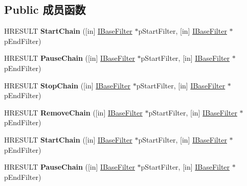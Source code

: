 \subsection*{Public 成员函数}
\begin{DoxyCompactItemize}
\item 
\mbox{\label{interface_i_filter_chain_a73c6357687d49a1899e3050467015457}} 
H\+R\+E\+S\+U\+LT {\bfseries Start\+Chain} (\mbox{[}in\mbox{]} \hyperlink{interface_i_base_filter}{I\+Base\+Filter} $\ast$p\+Start\+Filter, \mbox{[}in\mbox{]} \hyperlink{interface_i_base_filter}{I\+Base\+Filter} $\ast$p\+End\+Filter)
\item 
\mbox{\label{interface_i_filter_chain_a8cca21654dbb12c9628b6d4a640fdad8}} 
H\+R\+E\+S\+U\+LT {\bfseries Pause\+Chain} (\mbox{[}in\mbox{]} \hyperlink{interface_i_base_filter}{I\+Base\+Filter} $\ast$p\+Start\+Filter, \mbox{[}in\mbox{]} \hyperlink{interface_i_base_filter}{I\+Base\+Filter} $\ast$p\+End\+Filter)
\item 
\mbox{\label{interface_i_filter_chain_a8a05cfed16246fe01af19e4a2fe88d88}} 
H\+R\+E\+S\+U\+LT {\bfseries Stop\+Chain} (\mbox{[}in\mbox{]} \hyperlink{interface_i_base_filter}{I\+Base\+Filter} $\ast$p\+Start\+Filter, \mbox{[}in\mbox{]} \hyperlink{interface_i_base_filter}{I\+Base\+Filter} $\ast$p\+End\+Filter)
\item 
\mbox{\label{interface_i_filter_chain_a9441b421c84e989188e3fef73cf29553}} 
H\+R\+E\+S\+U\+LT {\bfseries Remove\+Chain} (\mbox{[}in\mbox{]} \hyperlink{interface_i_base_filter}{I\+Base\+Filter} $\ast$p\+Start\+Filter, \mbox{[}in\mbox{]} \hyperlink{interface_i_base_filter}{I\+Base\+Filter} $\ast$p\+End\+Filter)
\item 
\mbox{\label{interface_i_filter_chain_a73c6357687d49a1899e3050467015457}} 
H\+R\+E\+S\+U\+LT {\bfseries Start\+Chain} (\mbox{[}in\mbox{]} \hyperlink{interface_i_base_filter}{I\+Base\+Filter} $\ast$p\+Start\+Filter, \mbox{[}in\mbox{]} \hyperlink{interface_i_base_filter}{I\+Base\+Filter} $\ast$p\+End\+Filter)
\item 
\mbox{\label{interface_i_filter_chain_a8cca21654dbb12c9628b6d4a640fdad8}} 
H\+R\+E\+S\+U\+LT {\bfseries Pause\+Chain} (\mbox{[}in\mbox{]} \hyperlink{interface_i_base_filter}{I\+Base\+Filter} $\ast$p\+Start\+Filter, \mbox{[}in\mbox{]} \hyperlink{interface_i_base_filter}{I\+Base\+Filter} $\ast$p\+End\+Filter)

\end{DoxyCompactItemize}
